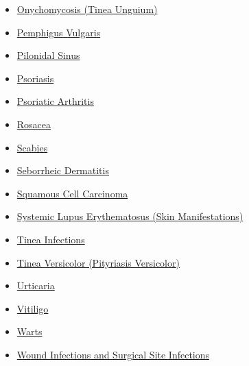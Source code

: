 \begin{itemize}[noitemsep]
  \item \hyperlink{sec:Onychomycosis (Tinea Unguium)}{Onychomycosis (Tinea Unguium)}
  \item \hyperlink{sec:Pemphigus Vulgaris}{Pemphigus Vulgaris}
  \item \hyperlink{sec:Pilonidal Sinus}{Pilonidal Sinus}
  \item \hyperlink{sec:Psoriasis}{Psoriasis}
  \item \hyperlink{sec:skin:Psoriatic Arthritis}{Psoriatic Arthritis}
  \item \hyperlink{sec:Rosacea}{Rosacea}
  \item \hyperlink{sec:Scabies}{Scabies}
  \item \hyperlink{sec:Seborrheic Dermatitis}{Seborrheic Dermatitis}
  \item \hyperlink{sec:Squamous Cell Carcinoma}{Squamous Cell Carcinoma}
  \item \hyperlink{sec:Systemic Lupus Erythematosus (Skin Manifestations)}{Systemic Lupus Erythematosus (Skin Manifestations)}
  \item \hyperlink{sec:Tinea Infections}{Tinea Infections}
  \item \hyperlink{sec:Tinea Versicolor (Pityriasis Versicolor)}{Tinea Versicolor (Pityriasis Versicolor)}
  \item \hyperlink{sec:Urticaria}{Urticaria}
  \item \hyperlink{sec:Vitiligo}{Vitiligo}
  \item \hyperlink{sec:Warts}{Warts}
  \item \hyperlink{sec:Wound Infections and Surgical Site Infections}{Wound Infections and Surgical Site Infections}
\end{itemize}

